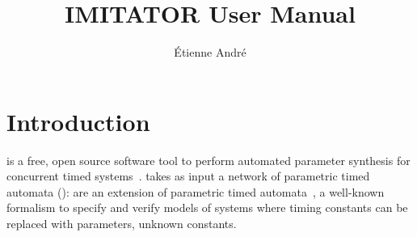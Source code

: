 
\newcommand{\titleOnHeader}{\textsf{IMITATOR} user manual}

\newcommand{\titleOnFirstPage}{IMITATOR User Manual}




\title{IMITATOR User Manual}
\author{Étienne André}












\chapter{Introduction}

\imitator{} is a free, open source software tool to perform automated parameter synthesis for concurrent timed systems~\cite{Andre21}.
\imitator{} takes as input a network of \imitator{} parametric timed automata (\NIPTA{}): \NIPTA{} are an extension of parametric timed automata~\cite{AHV93}, a well-known formalism to specify and verify models of systems where timing constants can be replaced with parameters, \ie{} unknown constants.


